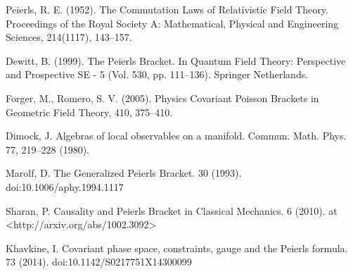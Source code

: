 \documentclass[a4paper,10pt]{amsart}
\begin{document}
\begin{thebibliography}{}

   Peierls, R. E. (1952). The Commutation Laws of Relativistic Field Theory. Proceedings of the Royal Society A: Mathematical, Physical and Engineering Sciences, 214(1117), 143–157. 
	
	 Dewitt, B. (1999). The Peierls Bracket. 	In Quantum Field Theory: Perspective and Prospective SE  - 5 (Vol. 530, pp. 111–136). Springer Netherlands. 
	
	  Forger, M., Romero, S. V. (2005). Physics Covariant Poisson Brackets in Geometric Field Theory, 410, 375–410.
	
	 Dimock, J. Algebras of local observables on a manifold. Commun. Math. Phys. 77, 219–228 (1980).
	
	 Marolf, D. The Generalized Peierls Bracket. 30 (1993). doi:10.1006/aphy.1994.1117
	
	 Sharan, P. Causality and Peierls Bracket in Classical Mechanics. 6 (2010). at <http://arxiv.org/abs/1002.3092>
	
	 Khavkine, I. Covariant phase space, constraints, gauge and the Peierls formula. 73 (2014). doi:10.1142/S0217751X14300099
	
	
  \end{thebibliography}
\end{document}
